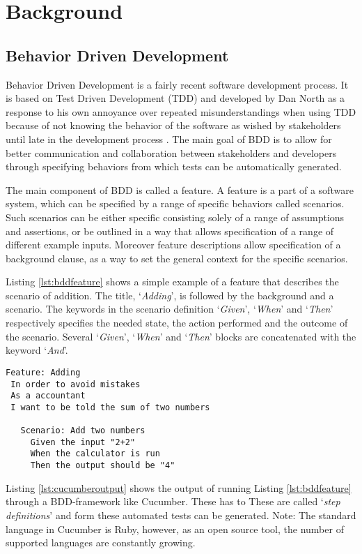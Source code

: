 \section{Background}

\subsection{Behavior Driven Development}
\label{sub:bdd}
Behavior Driven Development is a fairly recent software development process. 
It is based on Test Driven Development (TDD) and developed by Dan North as a response to his own annoyance over repeated misunderstandings when using TDD because of not knowing the behavior of the software as wished by stakeholders until late in the development process \cite{north2006}. 
The main goal of BDD is to allow for better communication and collaboration between stakeholders and developers through specifying behaviors from which tests can be automatically generated. 

The main component of BDD is called a feature. 
A feature is a part of a software system,
which can be specified by a range of specific behaviors called scenarios.
Such scenarios can be either specific consisting solely of a range of
assumptions and assertions, or be outlined in a way that allows
specification of a range of different example inputs.
Moreover feature descriptions allow specification of a background clause,
as a way to set the general context for the specific scenarios.

Listing \ref{lst:bddfeature} shows a simple example of a feature that describes the scenario of addition. 
The title, `\emph{Adding}', is followed by the background and a scenario. The keywords in the scenario definition `\emph{Given}', `\emph{When}' and `\emph{Then}' respectively specifies the needed state, the action performed and the outcome of the scenario. 
Several `\emph{Given}', `\emph{When}' and `\emph{Then}' blocks are concatenated with the keyword `\emph{And}'.

\begin{lstlisting}[caption={Sample Addition Feature},label={lst:bddfeature}]
Feature: Adding
 In order to avoid mistakes 
 As a accountant
 I want to be told the sum of two numbers

   Scenario: Add two numbers
     Given the input "2+2"
     When the calculator is run 
     Then the output should be "4"
\end{lstlisting}

Listing \ref{lst:cucumberoutput} shows the output of running Listing \ref{lst:bddfeature} through a BDD-framework like Cucumber. These has to 
These are called `\emph{step definitions}' and form these automated tests can be generated. 
Note: The standard language in Cucumber is Ruby, however, as an open source tool, the number of supported languages are constantly growing. 

